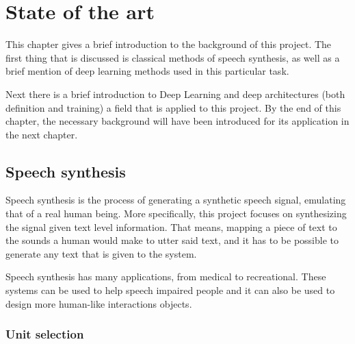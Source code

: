 \chapter{State of the art}

This chapter gives a brief introduction to the background of this project. The first thing that is discussed is classical methods of speech synthesis, as well as a brief mention of deep learning methods used in this particular task.

Next there is a brief introduction to Deep Learning and deep architectures (both definition and training) a field that is applied to this project. By the end of this chapter, the necessary background will have been introduced for its application in the next chapter.

\section{Speech synthesis}

Speech synthesis is the process of generating a synthetic speech signal, emulating that of a real human being. More specifically, this project focuses on synthesizing the signal given text level information. That means, mapping a piece of text to the sounds a human would make to utter said text, and it has to be possible to generate any text that is given to the system.

Speech synthesis has many applications, from medical to recreational. These systems can be used to help speech impaired people and it can also be used to design more human-like interactions objects.


\subsection{Unit selection}

